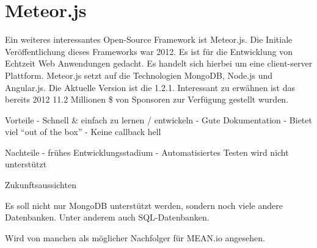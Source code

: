 \section{Meteor.js}\label{meteor.js}

Ein weiteres interessantes Open-Source Framework ist Meteor.js. Die
Initiale Veröffentlichung dieses Frameworks war 2012. Es ist für die
Entwicklung von Echtzeit Web Anwendungen gedacht. Es handelt sich
hierbei um eine client-server Plattform. Meteor.js setzt auf die
Technologien MongoDB, Node.js und Angular.js. Die Aktuelle Version ist
die 1.2.1. Interessant zu erwähnen ist das bereits 2012 11.2 Millionen
\$ von Sponsoren zur Verfügung gestellt wurden.

Vorteile - Schnell \& einfach zu lernen / entwickeln - Gute
Dokumentation - Bietet viel ``out of the box'' - Keine callback hell

Nachteile - frühes Entwicklungsstadium - Automatisiertes Testen wird
nicht unterstützt

Zukunftsaussichten

Es soll nicht nur MongoDB unterstützt werden, sondern noch viele andere
Datenbanken. Unter anderem auch SQL-Datenbanken.

Wird von manchen als möglicher Nachfolger für MEAN.io angesehen.
